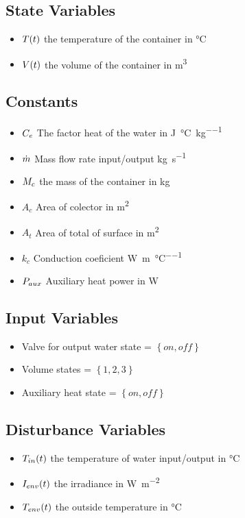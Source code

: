 \documentclass[a4paper,12pt]{book}
\begin{document}
    \subsection{State Variables}

    \begin{itemize}
    \item
    $T(t)$ the temperature of the container in \si{\degreeCelsius}
    \item
    $V(t)$ the volume of the container in \si{\metre^3}

    \end{itemize}

    \subsection{Constants}
    \begin{itemize}
    \item 
    $C_e$ The factor heat of the water in \si{\joule\per\degreeCelsius\per\kilogram}
    \item
    $\dot{m}$ Mass flow rate input/output  \si{\kilogram\per\second}
    \item
    $M_{c}$ the mass of the container in \si{\kilogram}
    \item
    $A_c$ Area of colector in \si{\metre^2}
    \item
    $A_t$ Area of total of surface in \si{\metre^2}
    \item
    $k_c$ Conduction coeficient \si{\watt\per\metre\per\degreeCelsius}
    \item
    $P_{aux}$ Auxiliary heat power in \si{\watt}

    \end{itemize}

    \subsection{Input Variables}
    \begin{itemize}
    \item
    Valve for output water state = $\left\lbrace on,off \right\rbrace $
    \item
    Volume states = $\left\lbrace1,2,3\right\rbrace $
    \item
    Auxiliary heat state = $\left\lbrace on,off \right\rbrace $


    \end{itemize}

    \subsection{Disturbance Variables}
    \begin{itemize}
    \item 
    $T_{in}(t)$ the temperature of water input/output in \si{\degreeCelsius}
    \item
    $I_{env}(t)$ the irradiance in \si{\watt\per\square\metre}
    \item
    $T_{env}(t)$ the outside temperature in \si{\degreeCelsius}
    \end{itemize}
\end{document}
